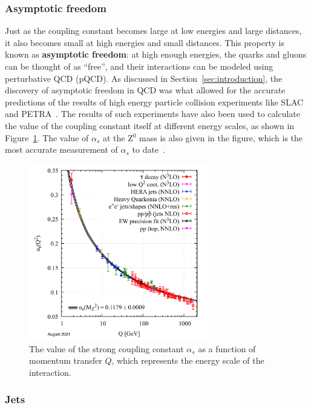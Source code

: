\subsubsection{Asymptotic freedom}
\label{sec:qcd_asymptotic_freedom}

Just as the coupling constant becomes large at low energies and large distances, it also becomes small at high energies and small distances. This property is known as \textbf{asymptotic freedom}: at high enough energies, the quarks and gluons can be thought of as ``free'', and their interactions can be modeled using perturbative QCD (pQCD). As discussed in Section~\ref{sec:introduction}, the discovery of asymptotic freedom in QCD was what allowed for the accurate predictions of the results of high energy particle collision experiments like SLAC~\cite{SLAC} and PETRA~\cite{PETRA}. The results of such experiments have also been used to calculate the value of the coupling constant itself at different energy scales, as shown in Figure~\ref{fig:asymptotic_freedom}. The value of $\alpha_s$ at the Z$^0$ mass is also given in the figure, which is the most accurate measurement of $\alpha_s$ to date~\cite{PDG}. 

\begin{figure}
    \centering
    \includegraphics[width=0.7\textwidth]{figures/introduction/running_coupling.png}
    \caption{The value of the strong coupling constant $\alpha_s$ as a function of momentum transfer $Q$, which represents the energy scale of the interaction.}
    \label{fig:asymptotic_freedom}
\end{figure}


\subsubsection{Jets}
\label{sec:jets}

